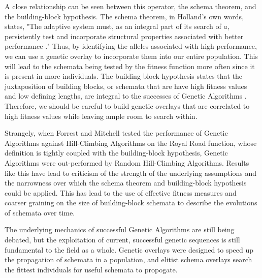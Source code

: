 %
%
A close relationship can be seen between this operator, the schema theorem, and the building-block hypothesis\cite{Goldberg89, Holland75}. The schema theorem, in Holland's own words, states, "The adaptive system must, as an integral part of its search of $a$, persistently test and incorporate structural properties associated with better performance \cite{Holland75}." Thus, by identifying the alleles associated with high performance, we can use a genetic overlay to incorporate them into our entire population. This will lead to the schemata being tested by the fitness function more often since it is present in more individuals. The building block hypothesis states that the juxtaposition of building blocks, or schemata that are have high fitness values and low defining lengths, are integral to the successes of Genetic Algorithms \cite{Goldberg89}. Therefore, we should be careful to build genetic overlays that are correlated to high fitness values while leaving ample room to search within.

Strangely, when Forrest and Mitchell tested the performance of Genetic Algorithms against Hill-Climbing Algorithms on the Royal Road function, whose definition is tightly coupled with the building-block hypothesis, Genetic Algorithms were out-performed\cite{Forrest93} by Random Hill-Climbing Algorithms. Results like this have lead to criticism of the strength of the underlying assumptions and the narrowness over which the schema theorem and building-block hypothesis could be applied\cite{Burjorjee08, Senaratna05}. This has lead to the use of effective fitness measures and coarser graining on the size of building-block schemata to describe the evolutions of schemata over time\cite{Stephens99}.

The underlying mechanics of successful Genetic Algorithms are still being debated, but the exploitation of current, successful genetic sequences is still fundamental to the field as a whole\cite{Russell10, Senaratna05}. Genetic overlays were designed to speed up the propagation of schemata in a population, and elitist schema overlays search the fittest individuals for useful schemata to propogate.